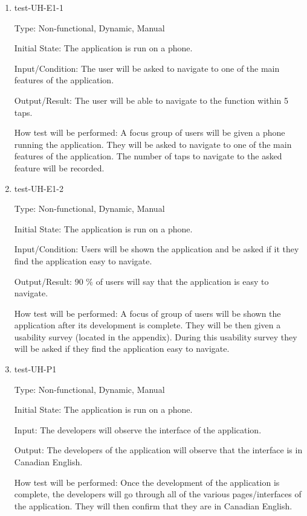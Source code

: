 \documentclass[12pt, titlepage]{article}
\begin{document}
\begin{enumerate}

\item{test-UH-E1-1\\}

Type: Non-functional, Dynamic, Manual
					
Initial State: The application is run on a phone.
					
Input/Condition: The user will be asked to navigate to one of the main features of the application.
					
Output/Result: The user will be able to navigate to the function within 5 taps.
					
How test will be performed: A focus group of users will be given a phone running the application. They  will be asked to navigate to one of the main features of the application. The number of taps to navigate to the asked feature will be recorded. 

\item{test-UH-E1-2\\}

Type: Non-functional, Dynamic, Manual 
					
Initial State: The application is run on a phone.
					
Input/Condition: Users will be shown the application and be asked if it they find the application easy to navigate. 
					
Output/Result: 90 \% of users will say that the application is easy to navigate. 
					
How test will be performed: A focus of group of users will be shown the application after its development is complete. They will be then given a usability survey (located in the appendix). During this usability survey they will be asked if they find the application easy to navigate.
					
\item{test-UH-P1\\}

Type: Non-functional, Dynamic, Manual
					
Initial State: The application is run on a phone.
					
Input: The developers will observe the interface of the application.
					
Output: The developers of the application will observe that the interface is in Canadian English.
					
How test will be performed: Once the development of the application is complete, the developers will go through all of the various pages/interfaces of the application. They will then confirm that they are in Canadian English.


\end{enumerate}
\end{document}
